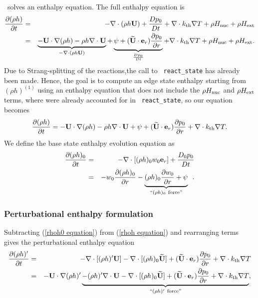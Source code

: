 \maestro\ solves an enthalpy equation.  
The full enthalpy equation is
\begin{eqnarray}
\frac{\partial(\rho h)}{\partial t} &=& -\nabla\cdot(\rho h {\bf U}) + \frac{Dp_0}{Dt} 
+ \nabla\cdot k_{\rm th} \nabla T + \rho H_{\rm nuc} + \rho H_{\rm ext} \nonumber \\
&=& \underbrace{-{\bf U}\cdot\nabla(\rho h) - \rho h\nabla\cdot{\bf U}}_{-\nabla\cdot(\rho h{\bf U})} 
+ \underbrace{\psi + (\widetilde{{\bf U}} \cdot \mathbf{e}_r) \frac{\partial p_0}{\partial r}}_{\frac{Dp_0}{Dt}} 
+ \nabla\cdot k_{\rm th}\nabla T + \rho H_{\rm nuc} + \rho H_{\rm ext}.
\end{eqnarray}
Due to Strang-splitting of the reactions,the call to {\tt
  react\_state} has already been made.  Hence, the goal is to compute
an edge state enthalpy starting from $(\rho h)^{(1)}$ using an
enthalpy equation that does not include the $\rho H_{\rm nuc}$ and
$\rho H_{\rm ext}$ terms, where were already accounted for in {\tt
  react\_state}, so our equation becomes
\begin{equation}
\frac{\partial(\rho h)}{\partial t} = -{\bf U}\cdot\nabla(\rho h) - \rho h\nabla\cdot{\bf U} 
+ \psi + (\widetilde{{\bf U}} \cdot \mathbf{e}_r) \frac{\partial p_0}{\partial r} + \nabla\cdot k_{\rm th}\nabla T. \label{rhoh equation}
\end{equation}
We define the base state enthalpy evolution equation as
\begin{eqnarray}
\frac{\partial(\rho h)_0}{\partial t} &=& -\nabla\cdot[(\rho h)_0 w_0{\bf e}_r] 
+ \frac{D_0p_0}{Dt} \nonumber \\
&=& -w_0\frac{\partial(\rho h)_0}{\partial r} 
- \underbrace{(\rho h)_0\frac{\partial w_0}{\partial r}+ \psi}_{``(\rho h)_0 ~ \text{force}"}
\enskip .\label{rhoh0 equation}
\end{eqnarray}

\subsubsection{Perturbational enthalpy formulation}

Subtracting (\ref{rhoh0 equation}) from (\ref{rhoh equation}) and
rearranging terms gives the perturbational enthalpy equation
\begin{eqnarray}
\frac{\partial(\rho h)'}{\partial t} &=& -\nabla\cdot[(\rho h)'{\bf U}] 
- \nabla\cdot[(\rho h)_0\widetilde{{\bf U}}] + (\widetilde{{\bf U}} \cdot \mathbf{e}_r)\frac{\partial p_0}{\partial r} 
+ \nabla\cdot k_{\rm th}\nabla T\nonumber \\
&=& -{\bf U}\cdot\nabla(\rho h)' \underbrace{- (\rho h)'\nabla\cdot{\bf U} 
- \nabla\cdot[(\rho h)_0\widetilde{{\bf U}}] + (\widetilde{{\bf U}} \cdot \mathbf{e}_r)\frac{\partial p_0}{\partial r}
+ \nabla\cdot k_{\rm th}\nabla T}_{``(\rho h)' ~ \text{force}"}, \label{rhohprime equation}
\end{eqnarray}

